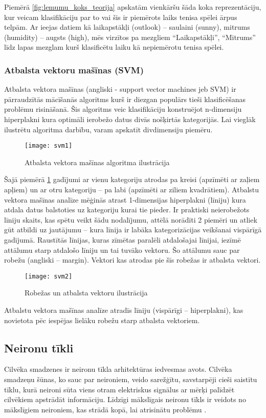 Piemērā \ref{fig:lemumu_koks_teorija} apskatām vienkāršu šāda koka reprezentāciju, kur veicam klasifikāciju par to vai šis ir piemērots laiks tenisa spēlei ārpus telpām. Ar ieejas datiem kā laikapstākļi (outlook) – saulaini (sunny), mitrums (humidity) – augsts (high), mēs virzītos pa mezgliem “Laikapstākļi”, “Mitrums” līdz lapas mezglam kurš klasificētu laiku kā nepiemērotu tenisa spēlei.

\subsubsection{Atbalsta vektoru mašīnas (SVM)}

Atbalsta vektora mašīnas \cite{supportvectornetworks} (angliski - support vector machines jeb SVM) ir pārraudzītās mācīšanās algoritms kurš ir diezgan populārs tieši klasificēšanas problēmu risināšanā. Šis algoritms veic klasifikāciju konstruējot n-dimensiju hiperplakni kura optimāli ierobežo datus divās nošķirtās kategorijās. Lai vieglāk ilustrētu algoritma darbību, varam apskatīt divdimensiju piemēru.
\begin{figure}[H]
	\texttt{[image: svm1]}
	\caption{Atbalsta vektora mašīnas algoritma ilustrācija \cite{supportvectornetworks} }
	\label{fig:svm1}
\end{figure}
Šajā piemērā \ref{fig:svm1} gadījumi ar vienu kategoriju atrodas pa kreisi (apzīmēti ar zaļiem apļiem) un ar otru kategoriju – pa labi (apzīmēti ar ziliem kvadrātiem). Atbalstu vektora mašīnas analīze mēģinās atrast 1-dimensijas hiperplakni (līniju) kura atdala datus balstoties uz kategoriju kurai tie pieder. Ir praktiski neierobežots līniju skaits, kas spētu veikt šādu nodalījumu, attēlā norādīti 2 piemēri un atliek gūt atbildi uz jautājumu – kura līnija ir labāka kategorizācijas veikšanai vispārīgā gadījumā. Raustītās līnijas, kuras zīmētas paralēli atdalošajai līnijai, iezīmē attālumu starp atdalošo līniju un tai tuvāko vektoru. Šo attālumu sauc par robežu (angliski – margin). Vektori kas atrodas pie šīs robežas ir atbalsta vektori.
\begin{figure}[H]
	\texttt{[image: svm2]}
	\caption{Robežas un atbalsta vektoru ilustrācija \cite{supportvectornetworks} }
	\label{fig:svm2}
\end{figure}
Atbalstu vektora mašīnas analīze atradīs līniju (vispārīgi – hiperplakni), kas novietota pēc iespējas lielāku robežu starp atbalsta vektoriem.

\subsection{Neironu tīkli}
Cilvēka smadzenes ir neironu tīkla arhitektūras iedvesmas avots. Cilvēka smadzeņu šūnas, ko sauc par neironiem, veido sarežģītu, savstarpēji cieši saistītu tīklu, kurā neironi sūta viens otram elektriskus signālus ar mērķi palīdzēt cilvēkiem apstrādāt informāciju. Līdzīgi mākslīgais neironu tīkls ir veidots no mākslīgiem neironiem, kas strādā kopā, lai atrisinātu problēmu \cite{AwsNeuralNetworks}. 

